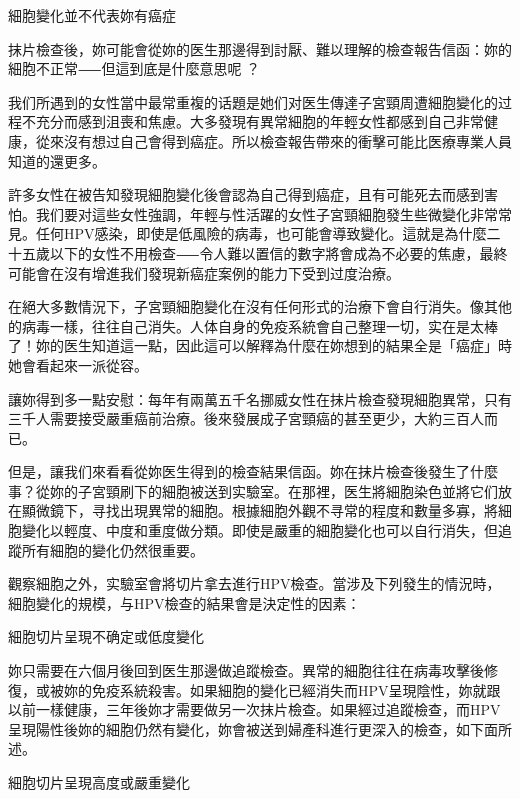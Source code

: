 \documentclass[12pt,UTF8]{ctexbook}
\begin{document}
細胞變化並不代表妳有癌症




抹片檢查後，妳可能會從妳的医生那邊得到討厭、難以理解的檢查報告信函：妳的細胞不正常⸺但這到底是什麼意思呢 ？

我们所遇到的女性當中最常重複的话題是她们对医生傳達子宮頸周遭細胞變化的过程不充分而感到沮喪和焦慮。大多發現有異常細胞的年輕女性都感到自己非常健康，從來沒有想过自己會得到癌症。所以檢查報告帶來的衝擊可能比医療專業人員知道的還更多。

許多女性在被告知發現細胞變化後會認為自己得到癌症，且有可能死去而感到害怕。我们要对這些女性強調，年輕与性活躍的女性子宮頸細胞發生些微變化非常常見。任何HPV感染，即使是低風險的病毒，也可能會導致變化。這就是為什麼二十五歲以下的女性不用檢查⸺令人難以置信的數字將會成為不必要的焦慮，最終可能會在沒有增進我们發現新癌症案例的能力下受到过度治療。

在絕大多數情況下，子宮頸細胞變化在沒有任何形式的治療下會自行消失。像其他的病毒一樣，往往自己消失。人体自身的免疫系統會自己整理一切，实在是太棒了！妳的医生知道這一點，因此這可以解釋為什麼在妳想到的結果全是「癌症」時她會看起來一派從容。

讓妳得到多一點安慰：每年有兩萬五千名挪威女性在抹片檢查發現細胞異常，只有三千人需要接受嚴重癌前治療。後來發展成子宮頸癌的甚至更少，大約三百人而已。

但是，讓我们來看看從妳医生得到的檢查結果信函。妳在抹片檢查後發生了什麼事？從妳的子宮頸刷下的細胞被送到实驗室。在那裡，医生將細胞染色並將它们放在顯微鏡下，寻找出現異常的細胞。根據細胞外觀不寻常的程度和數量多寡，將細胞變化以輕度、中度和重度做分類。即使是嚴重的細胞變化也可以自行消失，但追蹤所有細胞的變化仍然很重要。

觀察細胞之外，实驗室會將切片拿去進行HPV檢查。當涉及下列發生的情況時，細胞變化的規模，与HPV檢查的結果會是決定性的因素：





細胞切片呈現不确定或低度變化




妳只需要在六個月後回到医生那邊做追蹤檢查。異常的細胞往往在病毒攻擊後修復，或被妳的免疫系統殺害。如果細胞的變化已經消失而HPV呈現陰性，妳就跟以前一樣健康，三年後妳才需要做另一次抹片檢查。如果經过追蹤檢查，而HPV呈現陽性後妳的細胞仍然有變化，妳會被送到婦產科進行更深入的檢查，如下面所述。





細胞切片呈現高度或嚴重變化
\end{document}
